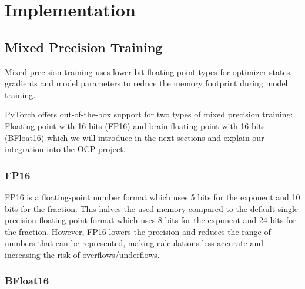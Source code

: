 \section{Implementation}

\subsection{Mixed Precision Training}

Mixed precision training uses lower bit floating point types for optimizer states, gradients and model parameters to 
reduce the memory footprint during model training. 

PyTorch offers out-of-the-box support for two types of mixed precision training: Floating point with 16 bits (FP16) and 
brain floating point with 16 bits (BFloat16) which we will introduce in the next sections and explain our integration 
into the OCP project.

\subsubsection{FP16}

FP16 is a floating-point number format which uses 5 bits for the exponent and 10 bits for the fraction. This halves the 
used memory compared to the default single-precision floating-point format which uses 8 bits for the exponent and 24 bits 
for the fraction. However, FP16 lowers the precision and reduces the range of numbers that can be represented, making 
calculations less accurate and increasing the risk of overflows/underflows.

\subsubsection{BFloat16}


